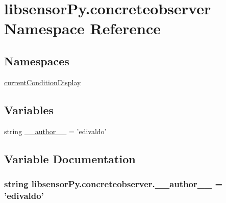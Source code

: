 \hypertarget{namespacelibsensorPy_1_1concreteobserver}{}\section{libsensor\+Py.\+concreteobserver Namespace Reference}
\label{namespacelibsensorPy_1_1concreteobserver}
\subsection*{Namespaces}
\begin{DoxyCompactItemize}
\item 
 \hyperlink{namespacelibsensorPy_1_1concreteobserver_1_1currentConditionDisplay}{current\+Condition\+Display}
\end{DoxyCompactItemize}
\subsection*{Variables}
\begin{DoxyCompactItemize}
\item 
string \hyperlink{namespacelibsensorPy_1_1concreteobserver_a24ac70a9c830f7598ca69cf4012051b2}{\+\_\+\+\_\+author\+\_\+\+\_\+} = 'edivaldo'
\end{DoxyCompactItemize}


\subsection{Variable Documentation}
\hypertarget{namespacelibsensorPy_1_1concreteobserver_a24ac70a9c830f7598ca69cf4012051b2}{}
\subsubsection[{\+\_\+\+\_\+author\+\_\+\+\_\+}]{\setlength{\rightskip}{0pt plus 5cm}string libsensor\+Py.\+concreteobserver.\+\_\+\+\_\+author\+\_\+\+\_\+ = 'edivaldo'}\label{namespacelibsensorPy_1_1concreteobserver_a24ac70a9c830f7598ca69cf4012051b2}
